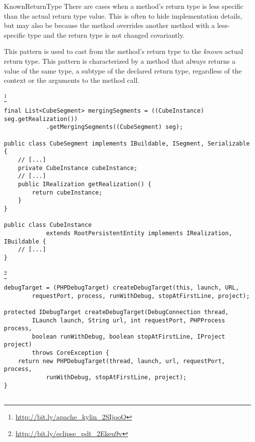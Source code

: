 \begin{pattern}{KnownReturnType}
There are cases when a method's return type is less specific than the
actual return type value.
This is often to hide implementation details, but may also be because the
  method overrides another method with a less-specific type
  and the return type is not changed covariantly.

This pattern is used to cast from the method's return type to
the \emph{known} actual return type.
This pattern is characterized by a method that always returns a
value of the same type, a subtype of the declared return type,
regardless of the context or the arguments to the method call.

\instances{}
\footnote{\url{http://bit.ly/apache_kylin_2SIjooO}}


\begin{verbatim}
final List<CubeSegment> mergingSegments = ((CubeInstance) seg.getRealization())
            .getMergingSegments((CubeSegment) seg);

public class CubeSegment implements IBuildable, ISegment, Serializable {
    // [...]
    private CubeInstance cubeInstance;
    // [...]
    public IRealization getRealization() {
        return cubeInstance;
    }
}

public class CubeInstance
            extends RootPersistentEntity implements IRealization, IBuildable {
    // [...]
}
\end{verbatim}


\footnote{\url{http://bit.ly/eclipse_pdt_2Ekeu9v}}

\begin{verbatim}
debugTarget = (PHPDebugTarget) createDebugTarget(this, launch, URL,
        requestPort, process, runWithDebug, stopAtFirstLine, project);

protected IDebugTarget createDebugTarget(DebugConnection thread,
        ILaunch launch, String url, int requestPort, PHPProcess process,
        boolean runWithDebug, boolean stopAtFirstLine, IProject project)
        throws CoreException {
    return new PHPDebugTarget(thread, launch, url, requestPort, process,
            runWithDebug, stopAtFirstLine, project);
}


\end{verbatim}
\end{pattern}
